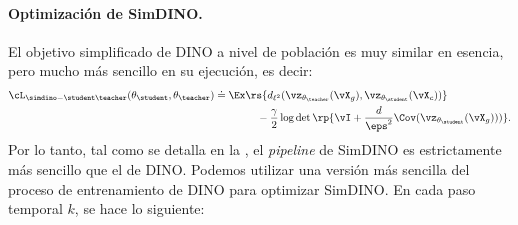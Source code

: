 \documentclass[../../book-main_es.tex]{subfiles}
\begin{document}
\paragraph{Optimización de SimDINO.} El objetivo simplificado de DINO a nivel de población
es muy similar en esencia, pero mucho más sencillo en su ejecución, es decir:
\begin{align}\label{eq:simdino_loss_teacherstudent}
    \cL_{\simdino-\student\teacher}(\theta_{\student},
    \theta_{\teacher}) &\doteq
    \Ex\rs{d_{\ell^{2}}(\vz_{\theta_{\teacher}}(\vX_{g}),
    \vz_{\theta_{\student}}(\vX_{c}))} \\
    &\qquad \qquad - \frac{\gamma}{2}\log\det\rp{\vI
+ \frac{d}{\eps^{2}}\Cov(\vz_{\theta_{\student}}(\vX_{g})))}.
\end{align}
Por lo tanto, tal como se detalla en la , el \textit{pipeline} de SimDINO
es estrictamente más sencillo que el de DINO. Podemos utilizar una
versión más sencilla del proceso de entrenamiento de DINO para optimizar SimDINO. En
cada paso temporal \(k\), se hace lo siguiente:
\end{document}
